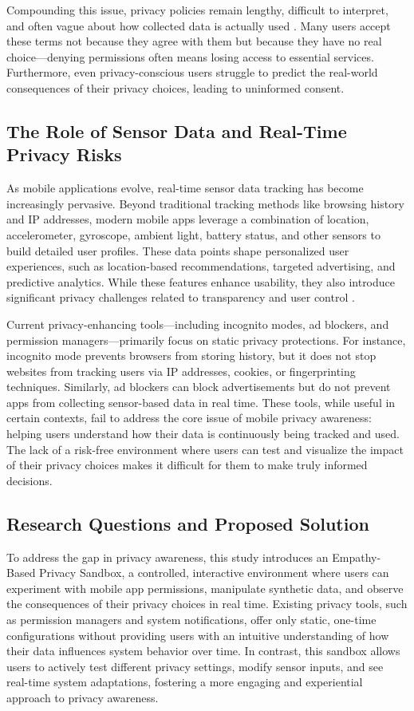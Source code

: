 \documentclass[acmlarge, nonacm]{acmart}
\begin{document}
Compounding this issue, privacy policies remain lengthy, difficult to interpret, and often vague about how collected data is actually used \cite{ObarandOeldorf-Hirsch2020}. Many users accept these terms not because they agree with them but because they have no real choice—denying permissions often means losing access to essential services. Furthermore, even privacy-conscious users struggle to predict the real-world consequences of their privacy choices, leading to uninformed consent.

\subsection{The Role of Sensor Data and Real-Time Privacy Risks}

As mobile applications evolve, real-time sensor data tracking has become increasingly pervasive. Beyond traditional tracking methods like browsing history and IP addresses, modern mobile apps leverage a combination of location, accelerometer, gyroscope, ambient light, battery status, and other sensors to build detailed user profiles. These data points shape personalized user experiences, such as location-based recommendations, targeted advertising, and predictive analytics. While these features enhance usability, they also introduce significant privacy challenges related to transparency and user control \cite{rathi2025predictive}.

Current privacy-enhancing tools—including incognito modes, ad blockers, and permission managers—primarily focus on static privacy protections. For instance, incognito mode prevents browsers from storing history, but it does not stop websites from tracking users via IP addresses, cookies, or fingerprinting techniques. Similarly, ad blockers can block advertisements but do not prevent apps from collecting sensor-based data in real time. These tools, while useful in certain contexts, fail to address the core issue of mobile privacy awareness: helping users understand how their data is continuously being tracked and used. The lack of a risk-free environment where users can test and visualize the impact of their privacy choices makes it difficult for them to make truly informed decisions.

\subsection{Research Questions and Proposed Solution}

To address the gap in privacy awareness, this study introduces an Empathy-Based Privacy Sandbox, a controlled, interactive environment where users can experiment with mobile app permissions, manipulate synthetic data, and observe the consequences of their privacy choices in real time. Existing privacy tools, such as permission managers and system notifications, offer only static, one-time configurations without providing users with an intuitive understanding of how their data influences system behavior over time. In contrast, this sandbox allows users to actively test different privacy settings, modify sensor inputs, and see real-time system adaptations, fostering a more engaging and experiential approach to privacy awareness.
\end{document}
